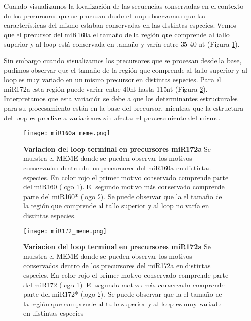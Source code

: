 Cuando visualizamos la localización de las secuencias conservadas en el contexto de los precursores que se procesan desde el loop observamos que las características del mismo estaban conservadas en las distintas especies.
Vemos que el precursor del miR160a el tamaño de la región que comprende al tallo superior y al loop está conservada en tamaño y varía entre 35-40 nt (Figura \ref{fig:miR160a_meme}).

Sin embargo cuando visualizamos los precursores que se procesan desde la base, pudimos observar que el tamaño de la región que comprende al tallo superior y al loop es muy variado en un mismo precursor en distintas especies.
Para el miR172a esta región puede variar entre 40nt hasta 115nt (Figura \ref{fig:miR172_meme}). 
Interpretamos que esta variación se debe a que los determinantes estructurales para su procesamiento están en la base del precursor, mientras que la estructura del loop es proclive a variaciones sin afectar el procesamiento del mismo.


\begin{landscape}
    \begin{figure}[htbp!] 
        \centering    
        \texttt{[image: miR160a\_meme.png]}
        \caption[Variacion del loop terminal en precursores miR172a]{
			\textbf{Variacion del loop terminal en precursores miR172a}
        Se muestra el MEME donde se pueden observar los motivos conservados dentro de los precursores del miR160a en distintas especies.
        En color rojo el primer motivo conservado comprende parte del miR160 (logo 1).
        El segundo motivo más conservado comprende parte del miR160* (logo 2).
        Se puede observar que la el tamaño de la región que comprende al tallo superior y al loop no varía en distintas especies.
        }
        \label{fig:miR160a_meme}
    \end{figure}
\end{landscape}

\begin{landscape}
    \begin{figure}[htbp!] 
        \centering    
        \texttt{[image: miR172\_meme.png]}
        \caption[Variacion del loop terminal en precursores miR172a]{
			\textbf{Variacion del loop terminal en precursores miR172a}
        Se muestra el MEME donde se pueden observar los motivos conservados dentro de los precursores del miR172a en distintas especies.
        En color rojo el primer motivo conservado comprende parte del miR172 (logo 1).
        El segundo motivo más conservado comprende parte del miR172* (logo 2).
        Se puede observar que la el tamaño de la región que comprende al tallo superior y al loop es muy variado en distintas especies.
        }
        \label{fig:miR172_meme}
    \end{figure}
\end{landscape}


